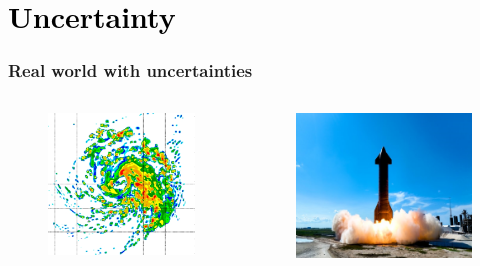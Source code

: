 
\section{\textcolor{black}{Uncertainty}} %



\begin{frame}
	\frametitle{Real world with uncertainties}
\begin{columns}
    \begin{figure}
    \includegraphics[width = 6cm]{figures/figure-typhoon.png}     
    \end{figure}    
    \begin{figure}
    \includegraphics[width = 7.2cm]{figures/figure-rocket.pdf}   
    \end{figure}    
\end{columns}
\end{frame}

